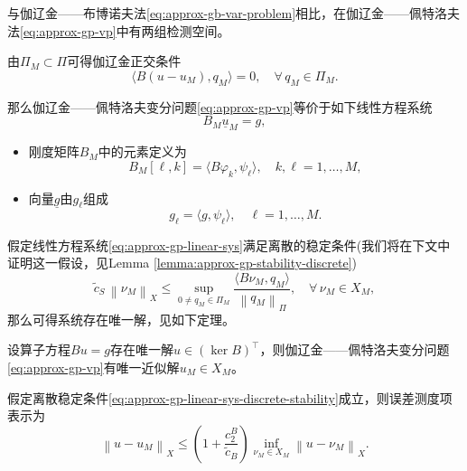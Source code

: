 与伽辽金——布博诺夫法\eqref{eq:approx-gb-var-problem}相比，在伽辽金——佩特洛夫法\eqref{eq:approx-gp-vp}中有两组检测空间。

由$\Pi_{M} \subset \Pi$可得伽辽金正交条件
\begin{equation}
  \label{eq:approxy-gb-orthogonality-cond}
  \langle B \left( u - u_{M} \right), q_{M} \rangle = 0, \quad \forall \, q_{M} \in \Pi_{M}.
\end{equation}

那么伽辽金——佩特洛夫变分问题\eqref{eq:approx-gp-vp}等价于如下线性方程系统
\begin{equation}
  \label{eq:approx-gp-linear-sys}
  B_{M} \underline{u}_{M} =g,
\end{equation}
\begin{itemize}
  \item 刚度矩阵$B_{M}$中的元素定义为
  \begin{equation*}
    B_{M} \left[\ell, k \right] = \langle B \varphi_{k}, \psi_{\ell} \rangle, \quad k, \ell = 1, \ldots, M,
  \end{equation*}
  \item 向量$\underline{g}$由$g_{\ell}$组成
  \begin{equation*}
    g_{\ell} = \langle g, \psi_{\ell} \rangle, \quad \ell = 1, \ldots, M.
  \end{equation*}
\end{itemize}

假定线性方程系统\eqref{eq:approx-gp-linear-sys}满足离散的稳定条件(我们将在下文中证明这一假设，见Lemma \ref{lemma:approx-gp-stability-discrete})
\begin{equation}
  \label{eq:approx-gp-linear-sys-discrete-stability}
  \tilde{c}_{S} \, \left\| \nu_{M} \right\|_{X}
  \le \sup_{0 \neq q_{M} \in \Pi_{M}}
  \frac{\langle B \nu_{M}, q_{M} \rangle}{\left\| q_{M} \right\|_{\Pi}},
  \quad \forall \, \nu_{M} \in X_{M},
\end{equation}
那么可得系统存在唯一解，见如下定理。

\begin{theorem}
  设算子方程$B u = g$存在唯一解$u \in \left( \ker B \right)^{\top}$，则伽辽金——佩特洛夫变分问题\eqref{eq:approx-gp-vp}有唯一近似解$u_{M} \in X_{M}$。

  假定离散稳定条件\eqref{eq:approx-gp-linear-sys-discrete-stability}成立，则误差测度项表示为
  \begin{equation}
    \label{eq:approx-gp-linear-sys-solution-uniq}
    \left\| u - u_{M} \right\|_{X}
    \le \left( 1 + \frac{c_{2}^{B}}{\widetilde{c}_{B}} \right)
    \inf_{\nu_{M} \in X_{M}} \left\| u - \nu_{M} \right\|_{X}.
  \end{equation}
\end{theorem}


